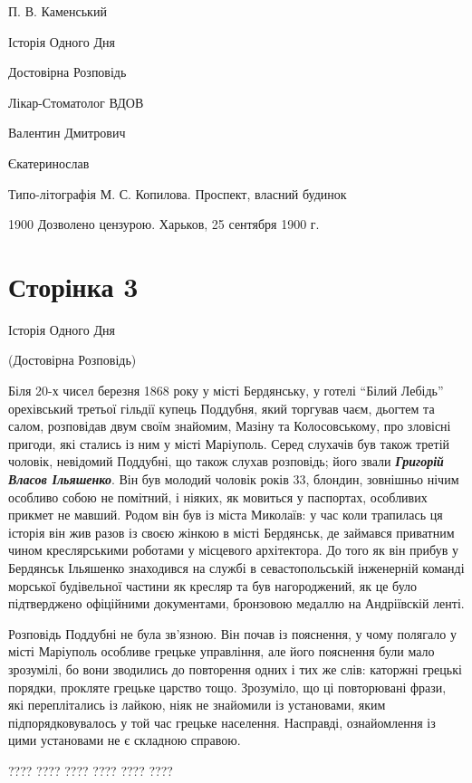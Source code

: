 \documentclass[a4paper,20pt]{report}
\begin{document}
\Large

П. В. Каменський

Історія Одного Дня

Достовірна Розповідь

Лікар-Стоматолог ВДОВ

Валентин Дмитрович

Єкатеринослав

Типо-літографія М. С. Копилова. Проспект, власний будинок

1900
Дозволено цензурою. Харьков, 25 сентября 1900 г.

\ifpages\section{Сторінка 3}\else\fi
Історія Одного Дня 

(Достовірна Розповідь)

Біля 20-х чисел березня 1868 року у місті Бердянську, у готелі ``Білий Лебідь''
орехівський третьої гільдії купець Поддубня, який торгував чаєм, дьогтем та
салом, розповідав двум своїм знайомим, Мазіну та Колосовському, про зловісні
пригоди, які стались із ним у місті Маріуполь. Серед слухачів був також третій
чоловік, невідомий Поддубні, що також слухав розповідь; його звали \textbf{\em
Григорій Власов Ільяшенко}. Він був молодий чоловік років 33, блондин,
зовнішньо нічим особливо собою не помітний, і ніяких, як мовиться у паспортах,
особливих прикмет не мавший.  Родом він був із міста Миколаїв: у час коли
трапилась ця історія він жив разов із своєю жінкою в місті Бердянськ, де
займався приватним чином креслярськими роботами у місцевого архітектора. До
того як він прибув у Бердянськ Ільяшенко знаходився на службі в
севастопольській інженерній команді морської будівельної частини як кресляр та
був нагороджений, як це було підтверджено офіційними документами, бронзовою
медаллю на Андріївскій ленті.

Розповідь Поддубні не була зв'язною. Він почав із пояснення, у чому полягало у
місті Маріуполь особливе грецьке управління, але його пояснення були мало
зрозумілі, бо вони зводились до повторення одних і тих же слів: каторжні
грецькі порядки, прокляте грецьке царство тощо. Зрозуміло, що ці повторювані
фрази, які переплітались із лайкою, ніяк не знайомили із установами, яким
підпорядковувалось у той час грецьке населення. Насправді, ознайомлення із цими
установами не є складною справою.

????  ????  ????  ????  ????  ????
\end{document}
